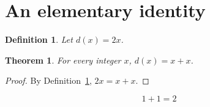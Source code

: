 \documentclass{article}
\newtheorem{theorem}{Theorem}
\newtheorem{definition}{Definition}
\begin{document}
\section{An elementary identity}
\begin{definition}\label{def:double}Let $d(x)=2x$.\end{definition}
\begin{theorem}\label{thm:double}For every integer $x$, $d(x)=x+x$.\end{theorem}
\begin{proof}By Definition~\ref{def:double}, $2x=x+x$.\end{proof}
\begin{equation}\label{eq:one}1+1=2\end{equation}
\end{document}
